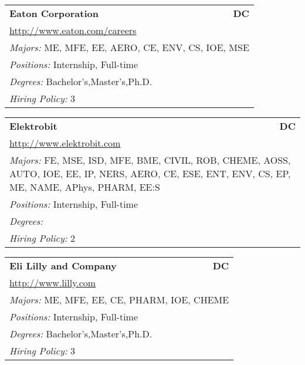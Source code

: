 \documentclass[twoside]{article}
\begin{document}
\begin{center}
\begin{multicols}{3}
\begin{FlushLeft}
\begin{minipage}{\columnwidth}\begin{tabularx}{.95\columnwidth}{Xr}
                 {\Large\bf Eaton Corporation} & {\Large\bf DC}\\
    \multicolumn{2}{p{.95\columnwidth}}{\url{http://www.eaton.com/careers}}\\
    \multicolumn{2}{p{.95\columnwidth}}{\emph{Majors:} ME, MFE, EE, AERO, CE, ENV, CS, IOE, MSE}\\
    \multicolumn{2}{p{.95\columnwidth}}{\emph{Positions:} Internship, Full-time}\\
    \multicolumn{2}{p{.95\columnwidth}}{\emph{Degrees:} Bachelor's,Master's,Ph.D.}\\
    \multicolumn{2}{p{.95\columnwidth}}{\emph{Hiring Policy:} 3}\\
    \end{tabularx}
    
\end{minipage}
 
\begin{minipage}{\columnwidth}\begin{tabularx}{.95\columnwidth}{Xr}
                 {\Large\bf Elektrobit} & {\Large\bf DC}\\
    \multicolumn{2}{p{.95\columnwidth}}{\url{http://www.elektrobit.com}}\\
    \multicolumn{2}{p{.95\columnwidth}}{\emph{Majors:} FE, MSE, ISD, MFE, BME, CIVIL, ROB, CHEME, AOSS, AUTO, IOE, EE, IP, NERS, AERO, CE, ESE, ENT, ENV, CS, EP, ME, NAME, APhys, PHARM, EE:S}\\
    \multicolumn{2}{p{.95\columnwidth}}{\emph{Positions:} Internship, Full-time}\\
    \multicolumn{2}{p{.95\columnwidth}}{\emph{Degrees:} }\\
    \multicolumn{2}{p{.95\columnwidth}}{\emph{Hiring Policy:} 2}\\
    \end{tabularx}
    
\end{minipage}
 
\begin{minipage}{\columnwidth}\begin{tabularx}{.95\columnwidth}{Xr}
                 {\Large\bf Eli Lilly and Company} & {\Large\bf DC}\\
    \multicolumn{2}{p{.95\columnwidth}}{\url{http://www.lilly.com}}\\
    \multicolumn{2}{p{.95\columnwidth}}{\emph{Majors:} ME, MFE, EE, CE, PHARM, IOE, CHEME}\\
    \multicolumn{2}{p{.95\columnwidth}}{\emph{Positions:} Internship, Full-time}\\
    \multicolumn{2}{p{.95\columnwidth}}{\emph{Degrees:} Bachelor's,Master's,Ph.D.}\\
    \multicolumn{2}{p{.95\columnwidth}}{\emph{Hiring Policy:} 3}\\
    \end{tabularx}
    

\end{minipage}
\end{FlushLeft}
\end{multicols}
\end{center}
\end{document}
